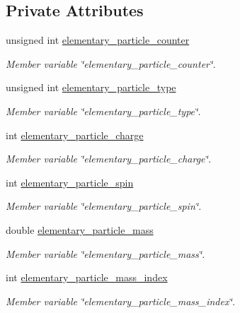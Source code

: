 \subsection*{Private Attributes}
\begin{DoxyCompactItemize}
\item 
unsigned int \mbox{\hyperlink{classElementaryParticle_a2fae6ea0f434b01e6dee5479c74bebfb}{elementary\+\_\+particle\+\_\+counter}}
\begin{DoxyCompactList}\small\item\em Member variable \char`\"{}elementary\+\_\+particle\+\_\+counter\char`\"{}. \end{DoxyCompactList}\item 
unsigned int \mbox{\hyperlink{classElementaryParticle_a68872e9f84702245f8c963b0dea2472d}{elementary\+\_\+particle\+\_\+type}}
\begin{DoxyCompactList}\small\item\em Member variable \char`\"{}elementary\+\_\+particle\+\_\+type\char`\"{}. \end{DoxyCompactList}\item 
int \mbox{\hyperlink{classElementaryParticle_a61555c6c0ba98944282f9f868260b698}{elementary\+\_\+particle\+\_\+charge}}
\begin{DoxyCompactList}\small\item\em Member variable \char`\"{}elementary\+\_\+particle\+\_\+charge\char`\"{}. \end{DoxyCompactList}\item 
int \mbox{\hyperlink{classElementaryParticle_a599cb91c4a19db54599c8b47c18f1136}{elementary\+\_\+particle\+\_\+spin}}
\begin{DoxyCompactList}\small\item\em Member variable \char`\"{}elementary\+\_\+particle\+\_\+spin\char`\"{}. \end{DoxyCompactList}\item 
double \mbox{\hyperlink{classElementaryParticle_aaa8e3d6d924875e6dc63b8156181de48}{elementary\+\_\+particle\+\_\+mass}}
\begin{DoxyCompactList}\small\item\em Member variable \char`\"{}elementary\+\_\+particle\+\_\+mass\char`\"{}. \end{DoxyCompactList}\item 
int \mbox{\hyperlink{classElementaryParticle_aff63a6097a70d03bf283fea0fc5e461c}{elementary\+\_\+particle\+\_\+mass\+\_\+index}}
\begin{DoxyCompactList}\small\item\em Member variable \char`\"{}elementary\+\_\+particle\+\_\+mass\+\_\+index\char`\"{}. \end{DoxyCompactList}\item 

\end{DoxyCompactItemize}
